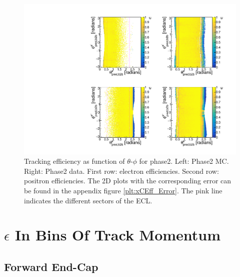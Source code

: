 \documentclass[a4paper,11pt,twosided,final,german,openbib,pdftex,listof=totoc,bibliography=totoc]{scrbook}
\begin{document}
\begin{figure}[!htbp]
	\centering
	\includegraphics[width=\textwidth]{Plots/master/xCEffTP_MCData.pdf}
	\caption[$\theta$-$\phi$ Efficiency Plots Phase2]{Tracking efficiency as function of $\theta$-$\phi$ for phase2. Left: Phase2 MC. Right: Phase2 data. First row: electron efficiencies. Second row: positron efficiencies. The 2D plots with the corresponding error can be found in the appendix figure \ref{plt:xCEff_Error}. The pink line indicates the different sectors of the ECL.}
	\label{plt:xCEff}
\end{figure}











\section{$\epsilon$ In Bins Of Track Momentum}







\subsection{Forward End-Cap}
\label{sec:MFC}
\end{document}
